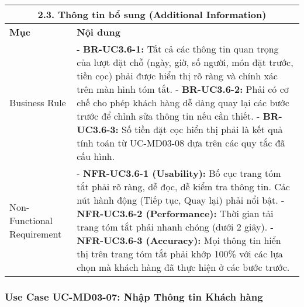 \begin{longtable}{|m{4cm}|p{11cm}|}
\hline
\multicolumn{2}{|c|}{\textbf{2.3. Thông tin bổ sung (Additional Information)}} \\
\hline
\textbf{Mục} & \textbf{Nội dung} \\
\hline
Business Rule & - \textbf{BR-UC3.6-1:} Tất cả các thông tin quan trọng của lượt đặt chỗ (ngày, giờ, số người, món đặt trước, tiền cọc) phải được hiển thị rõ ràng và chính xác trên màn hình tóm tắt. \newline - \textbf{BR-UC3.6-2:} Phải có cơ chế cho phép khách hàng dễ dàng quay lại các bước trước để chỉnh sửa thông tin nếu cần thiết. \newline - \textbf{BR-UC3.6-3:} Số tiền đặt cọc hiển thị phải là kết quả tính toán từ UC-MD03-08 dựa trên các quy tắc đã cấu hình. \\
\hline
Non-Functional Requirement & - \textbf{NFR-UC3.6-1 (Usability):} Bố cục trang tóm tắt phải rõ ràng, dễ đọc, dễ kiểm tra thông tin. Các nút hành động (Tiếp tục, Quay lại) phải nổi bật. \newline - \textbf{NFR-UC3.6-2 (Performance):} Thời gian tải trang tóm tắt phải nhanh chóng (dưới 2 giây). \newline - \textbf{NFR-UC3.6-3 (Accuracy):} Mọi thông tin hiển thị trên trang tóm tắt phải khớp 100\% với các lựa chọn mà khách hàng đã thực hiện ở các bước trước. \\
\hline
\end{longtable}

\subsubsection{Use Case UC-MD03-07: Nhập Thông tin Khách hàng}

